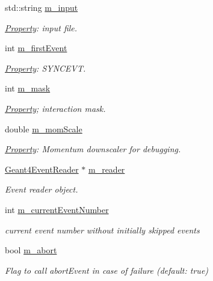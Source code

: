 \begin{DoxyCompactItemize}
\item 
std\+::string \hyperlink{class_d_d4hep_1_1_simulation_1_1_geant4_input_action_ac104781f934d0a6737dba78a2dfa6931}{m\+\_\+input}
\begin{DoxyCompactList}\small\item\em \hyperlink{class_d_d4hep_1_1_property}{Property}\+: input file. \end{DoxyCompactList}\item 
int \hyperlink{class_d_d4hep_1_1_simulation_1_1_geant4_input_action_a461a33c7eb46401092940394d40d99d7}{m\+\_\+first\+Event}
\begin{DoxyCompactList}\small\item\em \hyperlink{class_d_d4hep_1_1_property}{Property}\+: S\+Y\+N\+C\+E\+VT. \end{DoxyCompactList}\item 
int \hyperlink{class_d_d4hep_1_1_simulation_1_1_geant4_input_action_a850fdde95d63db4a76929fbda7ccf35e}{m\+\_\+mask}
\begin{DoxyCompactList}\small\item\em \hyperlink{class_d_d4hep_1_1_property}{Property}; interaction mask. \end{DoxyCompactList}\item 
double \hyperlink{class_d_d4hep_1_1_simulation_1_1_geant4_input_action_a1227cac9486e4a389da69f7078b93637}{m\+\_\+mom\+Scale}
\begin{DoxyCompactList}\small\item\em \hyperlink{class_d_d4hep_1_1_property}{Property}\+: Momentum downscaler for debugging. \end{DoxyCompactList}\item 
\hyperlink{class_d_d4hep_1_1_simulation_1_1_geant4_event_reader}{Geant4\+Event\+Reader} $\ast$ \hyperlink{class_d_d4hep_1_1_simulation_1_1_geant4_input_action_a68fd56256e10008e15de70d07797456c}{m\+\_\+reader}
\begin{DoxyCompactList}\small\item\em Event reader object. \end{DoxyCompactList}\item 
int \hyperlink{class_d_d4hep_1_1_simulation_1_1_geant4_input_action_a4b4cae1c79483e6f32ad70671984e422}{m\+\_\+current\+Event\+Number}
\begin{DoxyCompactList}\small\item\em current event number without initially skipped events \end{DoxyCompactList}\item 
bool \hyperlink{class_d_d4hep_1_1_simulation_1_1_geant4_input_action_a87b795b22ac455154122b4f210abf133}{m\+\_\+abort}
\begin{DoxyCompactList}\small\item\em Flag to call abort\+Event in case of failure (default\+: true) \end{DoxyCompactList}\end{DoxyCompactItemize}
